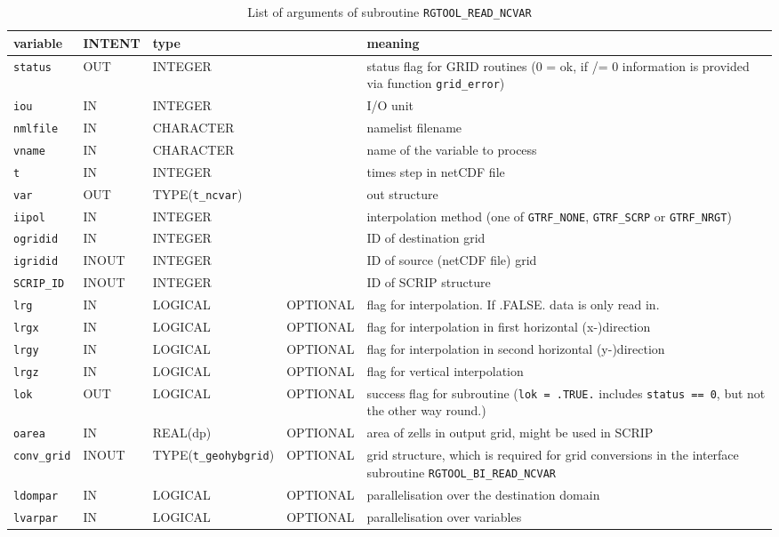 \documentclass[11pt,twoside]{report}
\begin{document}
\begin{table}[b]
{\footnotesize
\begin{tabular}{llllp{7.5cm}}
variable & INTENT & \multicolumn{2}{l}{type} & meaning \\ \hline
\verb|status|  & OUT & INTEGER & &status flag for GRID routines (0 = ok, if /= 0 information is provided via function \verb|grid_error|)\\
\verb|iou|     & IN  & INTEGER & &I/O unit \\
\verb|nmlfile| & IN  & CHARACTER & &namelist filename\\
\verb|vname|   & IN  & CHARACTER & &name of the variable to process \\
\verb|t|     & IN  & INTEGER & &times step in netCDF file\\
\verb|var|   & OUT  & TYPE(\verb|t_ncvar|)& & out structure \\
\verb|iipol| & IN  & INTEGER & &interpolation method (one of \verb|GTRF_NONE|, \verb|GTRF_SCRP| or \verb|GTRF_NRGT|)\\
\verb|ogridid|     & IN  & INTEGER & & ID of destination grid \\
\verb|igridid|     & INOUT  & INTEGER& & ID of source (netCDF file) grid  \\
\verb|SCRIP_ID|     & INOUT  &INTEGER & &ID of SCRIP structure \\
\verb|lrg|     & IN  & LOGICAL& OPTIONAL  & flag for interpolation. If .FALSE. data is only read in.\\
\verb|lrgx|     & IN  & LOGICAL & OPTIONAL  &  flag for interpolation in first horizontal (x-)direction\\
\verb|lrgy|     & IN  & LOGICAL & OPTIONAL  &  flag for interpolation in second horizontal \mbox{(y-)direction}\\
\verb|lrgz|     & IN  & LOGICAL & OPTIONAL  &  flag for vertical interpolation\\
\verb|lok|     & OUT  & LOGICAL & OPTIONAL &  success flag for subroutine (\verb|lok = .TRUE.| includes \verb|status == 0|, but not the other way round.)\\
\verb|oarea|     & IN  & REAL(dp) & OPTIONAL & area of zells in output grid, might be used in SCRIP\\
\verb|conv_grid|     & INOUT  & TYPE(\verb|t_geohybgrid|)& OPTIONAL &
grid structure, which is required for grid conversions in the interface subroutine \verb|RGTOOL_BI_READ_NCVAR| \\
\verb|ldompar|     & IN  & LOGICAL & OPTIONAL &  parallelisation over the destination domain\\
\verb|lvarpar|     & IN  & LOGICAL &  OPTIONAL & parallelisation over
variables  \\ \hline
\end{tabular}
}
\caption{List of arguments of subroutine {\tt RGTOOL\_READ\_NCVAR}\label{TabReadNCVAR}}
\end{table}
\end{document}
